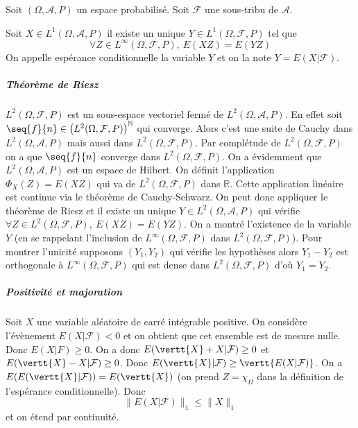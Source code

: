 \documentclass[10pt,a4paper]{article}
\begin{document}
Soit $(\Omega, \mathcal{A}, P)$ un espace probabilisé.
Soit $\mathcal{F}$ une sous-tribu de $\mathcal{A}$.

\begin{thm}
  Soit $X \in L^1(\Omega,\mathcal{A},P)$ il existe un unique $Y \in L^1(\Omega,\mathcal{F},P)$ tel que
  \[ \forall Z \in L^{\infty}(\Omega,\mathcal{F},P), \ E(XZ) = E(YZ)\]
  On appelle espérance conditionnelle la variable $Y$ et on la note $Y = E(X | \mathcal{F})$.
\end{thm}

\subparagraph{Théorème de Riesz} $L^2(\Omega,\mathcal{F},P)$ est un sous-espace vectoriel fermé de $L^2(\Omega,\mathcal{A},P)$. En effet soit $\seq{f}{n} \in \left(L^2(\Omega,\mathcal{F},P)\right)^{\mathbb{N}}$ qui converge. Alors c'est une suite de Cauchy dans $L^2(\Omega,\mathcal{A},P)$ mais aussi dans $L^2(\Omega,\mathcal{F},P)$. Par complétude de $L^2(\Omega,\mathcal{F},P)$ on a que $\seq{f}{n}$ converge dans $L^2(\Omega,\mathcal{F},P)$. On a évidemment que $L^2(\Omega,\mathcal{A},P)$ est un espace de Hilbert. On définit l'application $\Phi_X(Z)= E(XZ)$ qui va de $L^2(\Omega,\mathcal{F},P)$ dans $\mathbb{R}$. Cette application linéaire est continue via le théorème de Cauchy-Schwarz. On peut donc appliquer le théorème de Riesz et il existe un unique $Y \in L^2(\Omega,\mathcal{A},P)$ qui vérifie $\forall Z \in L^2(\Omega,\mathcal{F},P), \ E(XZ) = E(YZ)$. On a montré l'existence de la variable $Y$ (en se rappelant l'inclusion de $L^{\infty}(\Omega,\mathcal{F},P)$ dans $L^{2}(\Omega,\mathcal{F},P)$). Pour montrer l'unicité supposons $(Y_1,Y_2)$ qui vérifie les hypothèses alors $Y_1-Y_2$ est orthogonale à $L^{\infty}(\Omega,\mathcal{F},P)$ qui est dense dans $L^2(\Omega,\mathcal{F},P)$ d'où $Y_1=Y_2$.
\subparagraph{Positivité et majoration}
Soit $X$ une variable aléatoire de carré intégrable positive. On considère l'évènement $E(X|\mathcal{F})<0$ et on obtient que cet ensemble est de mesure nulle. Donc $E(X|F) \ge 0$.
On a donc $ E(\vertt{X} + X | \mathcal{F}) \ge 0$ et $ E(\vertt{X} - X | \mathcal{F}) \ge 0$. Donc
$E(\vertt{X} | \mathcal{F}) \ge \vertt{E(X | \mathcal{F})}$. On a $E(E(\vertt{X} | \mathcal{F})) = E(\vertt{X})$ (on prend $Z = \chi_{\Omega}$ dans la définition de l'espérance conditionnelle). Donc
\[ \| E(X | \mathcal{F}) \|_1 \le \|X\|_1 \]
et on étend par continuité.
\end{document}
